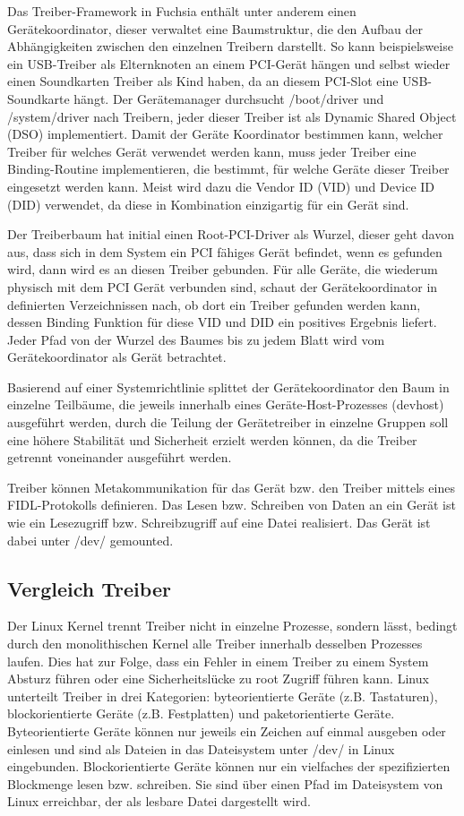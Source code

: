 \documentclass[a4paper]{scrartcl}
\begin{document}
Das Treiber-Framework in Fuchsia enthält unter anderem einen Gerätekoordinator, dieser verwaltet eine Baumstruktur, die den Aufbau der Abhängigkeiten zwischen den einzelnen Treibern darstellt. So kann beispielsweise ein USB-Treiber als Elternknoten an einem PCI-Gerät hängen und selbst wieder einen Soundkarten Treiber als Kind haben, da an diesem PCI-Slot eine USB-Soundkarte hängt. Der Gerätemanager durchsucht /boot/driver und /system/driver nach Treibern, jeder dieser Treiber ist als Dynamic Shared Object (DSO) implementiert. Damit der Geräte Koordinator bestimmen kann, welcher Treiber für welches Gerät verwendet werden kann, muss jeder Treiber eine Binding-Routine implementieren, die bestimmt, für welche Geräte dieser Treiber eingesetzt werden kann. Meist wird dazu die Vendor ID (VID) und Device ID (DID) verwendet, da diese in Kombination einzigartig für ein Gerät sind. \cite{Fuchsia.Drivers}

Der Treiberbaum hat initial einen Root-PCI-Driver als Wurzel, dieser geht davon aus, dass sich in dem System ein PCI fähiges Gerät befindet, wenn es gefunden wird, dann wird es an diesen Treiber gebunden. Für alle Geräte, die wiederum physisch mit dem PCI Gerät verbunden sind, schaut der Gerätekoordinator in definierten Verzeichnissen nach, ob dort ein Treiber gefunden werden kann, dessen Binding Funktion für diese VID und DID ein positives Ergebnis liefert. Jeder Pfad von der Wurzel des Baumes bis zu jedem Blatt wird vom Gerätekoordinator als Gerät betrachtet. \cite{Fuchsia.Drivers.Composite}

Basierend auf einer Systemrichtlinie splittet der Gerätekoordinator den Baum in einzelne Teilbäume, die jeweils innerhalb eines Geräte-Host-Prozesses (devhost) ausgeführt werden, durch die Teilung der Gerätetreiber in einzelne Gruppen soll eine höhere Stabilität und Sicherheit erzielt werden können, da die Treiber getrennt voneinander ausgeführt werden.\cite{Fuchsia.Drivers.Composite}

Treiber können Metakommunikation für das Gerät bzw. den Treiber mittels eines FIDL-Protokolls definieren. Das Lesen bzw. Schreiben von Daten an ein Gerät ist wie ein Lesezugriff bzw. Schreibzugriff auf eine Datei realisiert. Das Gerät ist dabei unter /dev/ gemounted.
\subsection{Vergleich Treiber}
Der Linux Kernel trennt Treiber nicht in einzelne Prozesse, sondern lässt, bedingt durch den monolithischen Kernel alle Treiber innerhalb desselben Prozesses laufen. Dies hat zur Folge, dass ein Fehler in einem Treiber zu einem System Absturz führen oder eine Sicherheitslücke zu root Zugriff führen kann. Linux unterteilt Treiber in drei Kategorien: byteorientierte Geräte (z.B. Tastaturen), blockorientierte Geräte (z.B. Festplatten) und paketorientierte Geräte. Byteorientierte Geräte können nur jeweils ein Zeichen auf einmal ausgeben oder einlesen und sind als Dateien in das Dateisystem unter /dev/ in Linux eingebunden. Blockorientierte Geräte können nur ein vielfaches der spezifizierten Blockmenge lesen bzw. schreiben. Sie sind über einen Pfad im Dateisystem von Linux erreichbar, der als lesbare Datei dargestellt wird. 
\end{document}
